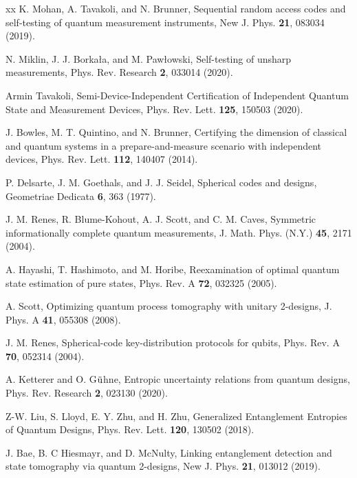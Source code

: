 \documentclass[letterpaper,preprint,superscriptaddress,floatfix,showpacs]{revtex4}
\begin{document}
\begin{thebibliography}{xx}
 K. Mohan, A. Tavakoli, and N. Brunner, Sequential random access codes and self-testing of quantum measurement instruments, New J. Phys. {\bf 21}, 083034 (2019).

 N. Miklin, J. J. Borka{\l}a, and M. Paw{\l}owski, Self-testing of unsharp measurements, Phys. Rev. Research {\bf 2}, 033014 (2020).



 Armin Tavakoli, Semi-Device-Independent Certification of Independent Quantum State and Measurement Devices, Phys. Rev. Lett. {\bf 125}, 150503 (2020).


 J. Bowles, M. T. Quintino, and N. Brunner, Certifying the dimension of classical and quantum systems in a prepare-and-measure scenario with independent devices, Phys. Rev. Lett. {\bf 112}, 140407 (2014).




 P. Delsarte, J. M. Goethals, and J. J. Seidel, Spherical codes and designs, Geometriae Dedicata {\bf 6}, 363 (1977).


 J. M. Renes, R. Blume-Kohout, A. J. Scott, and C. M. Caves, Symmetric informationally complete quantum measurements, J. Math. Phys. (N.Y.) {\bf 45}, 2171 (2004).


 A. Hayashi, T. Hashimoto, and M. Horibe, Reexamination of optimal quantum state estimation of pure states, Phys. Rev. A {\bf 72}, 032325 (2005).

 A. Scott, Optimizing quantum process tomography with unitary 2-designs, J. Phys. A {\bf 41}, 055308 (2008).


 J. M. Renes, Spherical-code key-distribution protocols for qubits, Phys. Rev. A {\bf 70}, 052314 (2004).




 A. Ketterer and O. G$\rm \ddot{u}$hne, Entropic uncertainty relations from quantum designs, Phys. Rev. Research {\bf 2}, 023130 (2020).


 Z-W. Liu, S. Lloyd, E. Y. Zhu, and H. Zhu, Generalized Entanglement Entropies of Quantum Designs, Phys. Rev. Lett. {\bf 120}, 130502 (2018).


 J. Bae, B. C Hiesmayr, and D. McNulty, Linking entanglement detection and state tomography via quantum 2-designs, New J. Phys. {\bf 21}, 013012 (2019).




\end{thebibliography}
\end{document}
